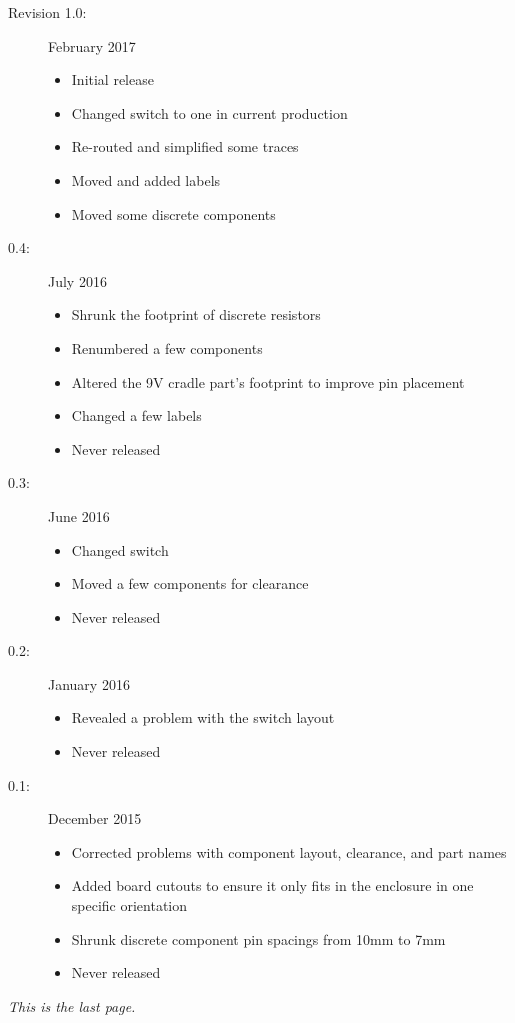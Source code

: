 \documentclass[12pt]{article}
\newcommand{\+}{\item}		%
\newcommand{\bi}{\begin{itemize}}
\newcommand{\ei}{\end{itemize}}
\newcommand{\bd}{\begin{description}}
\newcommand{\ed}{\end{description}}
\newcommand{\revision}{1.0}
\begin{document}
\bd

\+[Revision \revision{}:] February 2017
\bi
\+ Initial release
\+ Changed switch to one in current production
\+ Re-routed and simplified some traces
\+ Moved and added labels
\+ Moved some discrete components
\ei

\+[0.4:] July 2016
\bi
\+ Shrunk the footprint of discrete resistors
\+ Renumbered a few components
\+ Altered the 9V cradle part's footprint to improve pin placement
\+ Changed a few labels
\+ Never released
\ei

\+[0.3:] June 2016
\bi
\+ Changed switch
\+ Moved a few components for clearance
\+ Never released
\ei


\+[0.2:] January 2016
\bi
\+ Revealed a problem with the switch layout
\+ Never released
\ei

\+[0.1:] December 2015
\bi
\+ Corrected problems with component layout, clearance, and part names
\+ Added board cutouts to ensure it only fits in the enclosure in one specific orientation
\+ Shrunk discrete component pin spacings from 10mm to 7mm
\+ Never released
\ei
\ed

\vfill

\begin{center}
\emph{This is the last page.}
\end{center}
\end{document}
